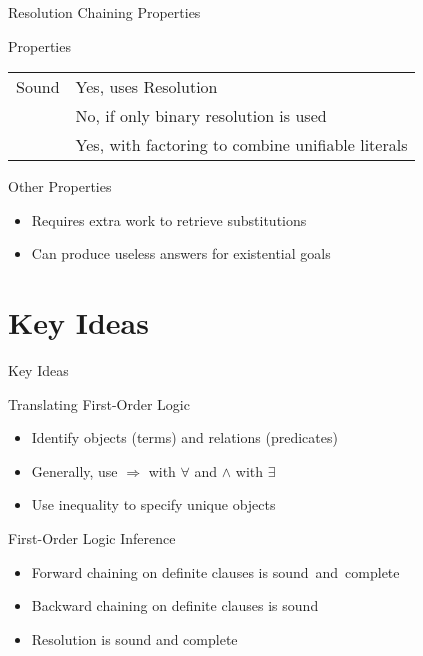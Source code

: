 \documentclass[12pt]{beamer}
\newcommand{\key}[1]{{\color{blue}#1}}
\newcommand{\limpl}{\Rightarrow}
\begin{document}
\begin{frame}{Resolution Chaining Properties}
	\begin{block}{Properties}
		\begin{tabular}{@{}ll@{}}
			\key{Sound}       & \pause Yes, uses Resolution \\
			\pause\key{Complete}    & \pause No, if only binary resolution is used \\
			                        & Yes, with factoring to combine unifiable literals
		\end{tabular}
	\end{block}
	\pause
	\begin{block}{Other Properties}
		\begin{itemize}
			\item Requires extra work to retrieve substitutions
			\item Can produce useless answers for existential goals
		\end{itemize}
	\end{block}
\end{frame}

\part{Key Ideas}
\begin{frame}{Key Ideas}
	\begin{block}{Translating First-Order Logic}
		\begin{itemize}
			\item Identify objects (terms) and relations (predicates)
			\item Generally, use $\limpl$ with $\forall$ and $\land$ with $\exists$
			\item Use inequality to specify unique objects
		\end{itemize}
	\end{block}
	\begin{block}{First-Order Logic Inference}
		\begin{itemize}
			\item Forward chaining on definite clauses is \mbox{sound and complete}
			\item Backward chaining on definite clauses is sound
			\item Resolution is sound and complete
		\end{itemize}
	\end{block}
\end{frame}
\end{document}
